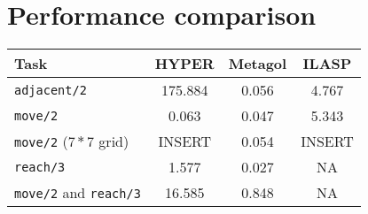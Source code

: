 \section{Performance comparison}\label{sec:perf}


{
\begin{center}
    \begin{tabular}{ |l|c|c|c| } 
        \hline
        Task & \textbf{HYPER} & \textbf{Metagol} & \textbf{ILASP} \\ \hline
        \texttt{adjacent/2} & 175.884 & 0.056 & 4.767 \\ 
        \texttt{move/2} & 0.063 & 0.047 & 5.343 \\ 
        \texttt{move/2} (\(7*7\) grid) & INSERT & 0.054 & INSERT \\ 
        \texttt{reach/3} & 1.577 & 0.027 & NA \\ 
        \texttt{move/2} and \texttt{reach/3} & 16.585 & 0.848 & NA \\ 
        \hline
    \end{tabular}
\end{center}
}